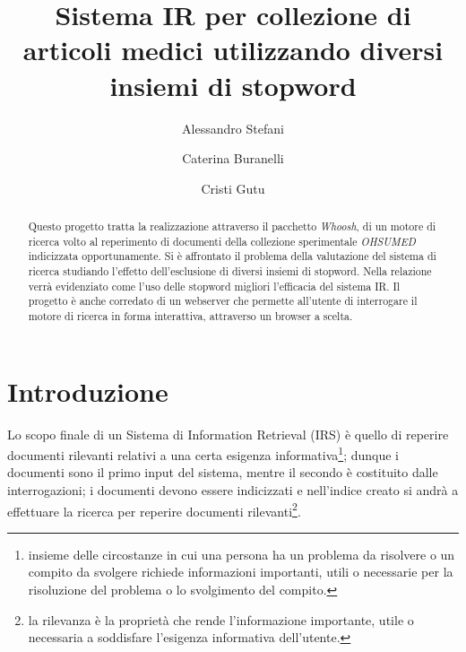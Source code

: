 \documentclass[runningheads]{llncs}
\begin{document}
%
\title{Sistema IR per collezione di articoli medici utilizzando diversi insiemi di stopword}
%
%
\author{%
  Alessandro Stefani \and
  Caterina Buranelli \and
  Cristi Gutu}
%
%
%
\maketitle

%
\begin{abstract}
Questo progetto tratta la realizzazione attraverso il pacchetto \emph{Whoosh}, di un motore di ricerca
volto al reperimento di documenti della collezione sperimentale \emph{OHSUMED} indicizzata opportunamente.
Si \`e affrontato il problema della valutazione del sistema di ricerca studiando l'effetto dell'esclusione
di diversi insiemi di stopword. Nella relazione verr\`a evidenziato come l'uso delle stopword migliori l'efficacia
del sistema IR.
Il progetto \`e anche corredato di un webserver che permette all'utente di interrogare il motore di ricerca
in forma interattiva, attraverso un browser a scelta.
\end{abstract}

\section{Introduzione}
\label{sec:introduzione}

Lo scopo finale di un Sistema di Information Retrieval (IRS) \`e quello di reperire documenti
 rilevanti relativi a una certa esigenza informativa\footnote{insieme delle circostanze in cui una
 persona ha un problema da risolvere o un compito da svolgere richiede informazioni
 importanti, utili o necessarie per la risoluzione del problema o lo svolgimento del compito.};
  dunque i documenti sono il primo input del sistema, mentre il secondo \`e
  costituito dalle interrogazioni; i documenti devono essere
  indicizzati e nell'indice creato si andr\`a a effettuare la ricerca per reperire documenti rilevanti\footnote{la rilevanza \`e la propriet\`a che rende l'informazione importante, utile o necessaria a soddisfare l'esigenza informativa dell'utente.}. 
  
\end{document}
